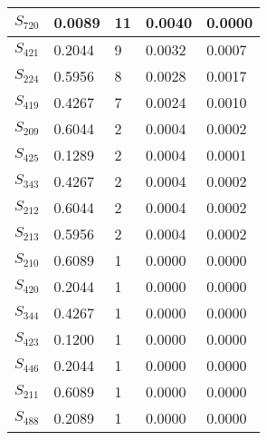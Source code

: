 \begin{xltabular}{\textwidth}{|X|X|X|X|X|}
 $S_{720}$ & 0.0089 & 11 & 0.0040 & 0.0000 \\ \hline
 $S_{421}$ & 0.2044 & 9 & 0.0032 & 0.0007 \\ \hline
 $S_{224}$ & 0.5956 & 8 & 0.0028 & 0.0017 \\ \hline
 $S_{419}$ & 0.4267 & 7 & 0.0024 & 0.0010 \\ \hline
 $S_{209}$ & 0.6044 & 2 & 0.0004 & 0.0002 \\ \hline
 $S_{425}$ & 0.1289 & 2 & 0.0004 & 0.0001 \\ \hline
 $S_{343}$ & 0.4267 & 2 & 0.0004 & 0.0002 \\ \hline
 $S_{212}$ & 0.6044 & 2 & 0.0004 & 0.0002 \\ \hline
 $S_{213}$ & 0.5956 & 2 & 0.0004 & 0.0002 \\ \hline
 $S_{210}$ & 0.6089 & 1 & 0.0000 & 0.0000 \\ \hline
 $S_{420}$ & 0.2044 & 1 & 0.0000 & 0.0000 \\ \hline
 $S_{344}$ & 0.4267 & 1 & 0.0000 & 0.0000 \\ \hline
 $S_{423}$ & 0.1200 & 1 & 0.0000 & 0.0000 \\ \hline
 $S_{446}$ & 0.2044 & 1 & 0.0000 & 0.0000 \\ \hline
 $S_{211}$ & 0.6089 & 1 & 0.0000 & 0.0000 \\ \hline
 $S_{488}$ & 0.2089 & 1 & 0.0000 & 0.0000 \\ \hline
    \end{xltabular}
    
